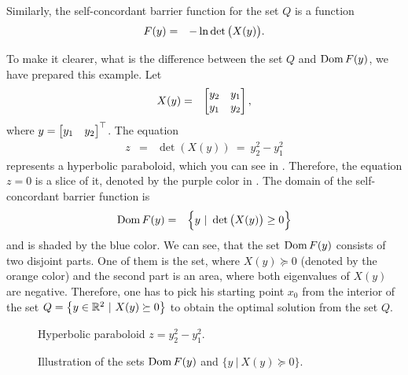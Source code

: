 Similarly, the self-concordant barrier function for the set $Q$ is a function 
\begin{eqnarray}
  F(y) &=& -\ln\det\big(X(y)\big). \labeleq{SDP:bf:bfy}
\end{eqnarray}

\begin{example}
  To make it clearer, what is the difference between the set $Q$ and $\operatorname{Dom} F(y)$, we have prepared this example. Let
  \begin{eqnarray}
    X(y) &=& \begin{bmatrix} y_2 & y_1 \\ y_1 & y_2 \end{bmatrix},
  \end{eqnarray}
  where $y = \begin{bmatrix} y_1 & y_2 \end{bmatrix}^\top$. The equation
  \begin{eqnarray}
    z &=& \det(X(y))\ =\ y_2^2 - y_1^2
  \end{eqnarray}
  represents a hyperbolic paraboloid, which you can see in .
  Therefore, the equation $z = 0$ is a slice of it, denoted by the purple color in . The domain of the self-concordant barrier function is
  \begin{eqnarray}
    \Dom F(y) &=& \Big\{y\ |\ \det\big(X(y)\big) \geq 0\Big\}\labeleq{SDP:bf:domF}
  \end{eqnarray}
  and is shaded by the blue color.
  We can see, that the set $\operatorname{Dom} F(y)$ consists of two disjoint parts. One of them is the set, where $X(y)\succeq0$ (denoted by the orange color) and the second part is an area, where both eigenvalues of $X(y)$ are negative.
  Therefore, one has to pick his starting point $x_0$ from the interior of the set $Q = \big\{y\in\mathbb{R}^2\ |\ X(y) \succeq 0\big\}$ to obtain the optimal solution from the set $Q$.

  \begin{figure}[ht]
    \centering
    \resizebox{0.95\textwidth}{!}{}
    \caption{Hyperbolic paraboloid $z = y_2^2 - y_1^2$.}
  \end{figure}

  \begin{figure}[ht]
    \centering
    \resizebox{0.95\textwidth}{!}{}
    \caption{Illustration of the sets $\operatorname{Dom} F(y)$ and $\big\{y\ |\ X(y) \succeq 0\big\}$.}
  \end{figure}
\end{example}

